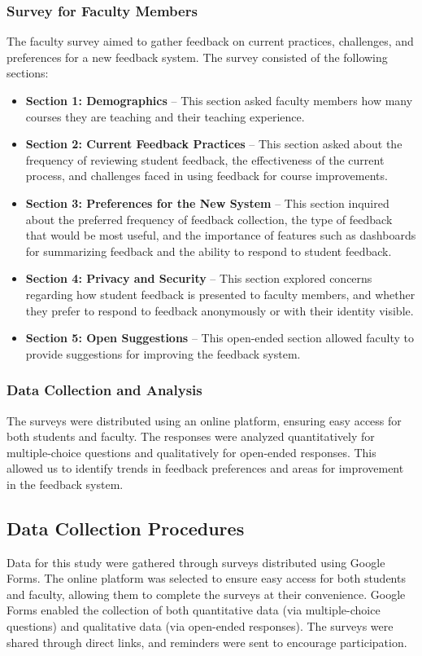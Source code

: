 \documentclass[conference]{IEEEtran}
\begin{document}
\subsubsection{Survey for Faculty Members}
The faculty survey aimed to gather feedback on current practices, challenges, and preferences for a new feedback system. The survey consisted of the following sections:

\begin{itemize}
    \item \textbf{Section 1: Demographics} – This section asked faculty members how many courses they are teaching and their teaching experience.
    \item \textbf{Section 2: Current Feedback Practices} – This section asked about the frequency of reviewing student feedback, the effectiveness of the current process, and challenges faced in using feedback for course improvements.
    \item \textbf{Section 3: Preferences for the New System} – This section inquired about the preferred frequency of feedback collection, the type of feedback that would be most useful, and the importance of features such as dashboards for summarizing feedback and the ability to respond to student feedback.
    \item \textbf{Section 4: Privacy and Security} – This section explored concerns regarding how student feedback is presented to faculty members, and whether they prefer to respond to feedback anonymously or with their identity visible.
    \item \textbf{Section 5: Open Suggestions} – This open-ended section allowed faculty to provide suggestions for improving the feedback system.
\end{itemize}

\subsubsection{Data Collection and Analysis}
The surveys were distributed using an online platform, ensuring easy access for both students and faculty. The responses were analyzed quantitatively for multiple-choice questions and qualitatively for open-ended responses. This allowed us to identify trends in feedback preferences and areas for improvement in the feedback system.


\subsection{Data Collection Procedures}
Data for this study were gathered through surveys distributed using Google Forms. The online platform was selected to ensure easy access for both students and faculty, allowing them to complete the surveys at their convenience. Google Forms enabled the collection of both quantitative data (via multiple-choice questions) and qualitative data (via open-ended responses). The surveys were shared through direct links, and reminders were sent to encourage participation.
\end{document}

